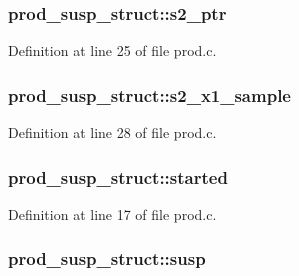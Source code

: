 \subsubsection[{\texorpdfstring{s2\+\_\+ptr}{s2_ptr}}]{ prod\+\_\+susp\+\_\+struct\+::s2\+\_\+ptr}\hypertarget{structprod__susp__struct_aba5de3bf9bafb77b85065773fd58120b}{}\label{structprod__susp__struct_aba5de3bf9bafb77b85065773fd58120b}


Definition at line 25 of file prod.\+c.

\subsubsection[{\texorpdfstring{s2\+\_\+x1\+\_\+sample}{s2_x1_sample}}]{ prod\+\_\+susp\+\_\+struct\+::s2\+\_\+x1\+\_\+sample}\hypertarget{structprod__susp__struct_a1cb0bdabf3ff33e5ab739a45f1b6d353}{}\label{structprod__susp__struct_a1cb0bdabf3ff33e5ab739a45f1b6d353}


Definition at line 28 of file prod.\+c.

\subsubsection[{\texorpdfstring{started}{started}}]{ prod\+\_\+susp\+\_\+struct\+::started}\hypertarget{structprod__susp__struct_aa051245a260de92fd7817bc26e53e4eb}{}\label{structprod__susp__struct_aa051245a260de92fd7817bc26e53e4eb}


Definition at line 17 of file prod.\+c.

\subsubsection[{\texorpdfstring{susp}{susp}}]{ prod\+\_\+susp\+\_\+struct\+::susp}\hypertarget{structprod__susp__struct_aef3403cd683e54e58efc0b5b5ce17809}{}\label{structprod__susp__struct_aef3403cd683e54e58efc0b5b5ce17809}


